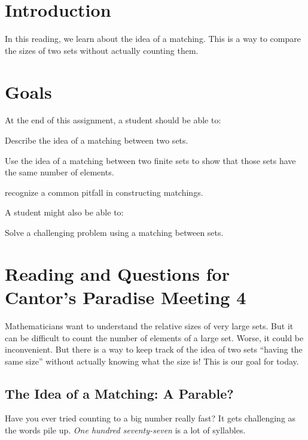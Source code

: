\documentclass[12pt,letterpaper]{article}
\theoremstyle{definition}
\begin{document}
\setlength{\parskip}{1ex plus 0.5ex minus 0.2ex}
\setlength{\parindent}{0pt}

\pagestyle{fancy}
\cfoot{}

\section*{Introduction}
In this reading, we learn about the idea of a matching. 
This is a way to compare the sizes of two sets without actually counting them.

\section*{Goals}
At the end of this assignment, a student should be able to:
\begin{compactitem}
\item Describe the idea of a matching between two sets.
\item Use the idea of a matching between two finite sets to show that those sets have the same number of elements.
\item recognize a common pitfall in constructing matchings.
\end{compactitem}
A student might also be able to:
\begin{compactitem}
\item Solve a challenging problem using a matching between sets.
\end{compactitem}

\section*{Reading and Questions for Cantor's Paradise Meeting 4}

Mathematicians want to understand the relative sizes of very large sets.
But it can be difficult to count the number of elements of a large set.
Worse, it could be inconvenient.
But there is a way to keep track of the idea of two sets ``having the same size'' without actually knowing what the size is!
This is our goal for today.

\subsection*{The Idea of a Matching: A Parable?}
Have you ever tried counting to a big number really fast?
It gets challenging as the words pile up. 
\emph{One hundred seventy-seven} is a lot of syllables.
\end{document}
